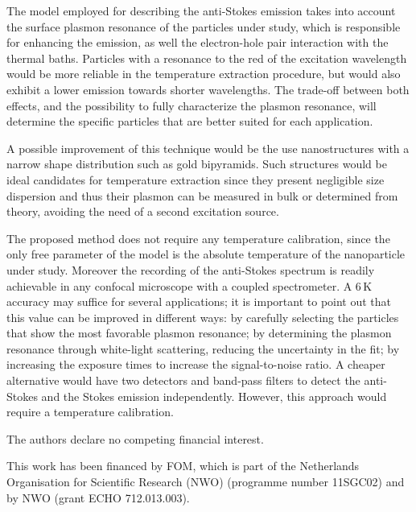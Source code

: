 \documentclass[journal=nalefd,manuscript=letter]{achemso}
\newcommand{\HI}[1]{{#1}} %
\newcommand{\K}{\ensuremath{\,\textrm{K}}}
\begin{document}
\HI{The model employed for describing the anti-Stokes emission takes into account
the surface plasmon resonance of the particles under study, which is responsible 
for enhancing the emission, as well the electron-hole pair
interaction with the thermal baths.}
Particles with a resonance to the red of the excitation wavelength would be more
reliable in the temperature extraction procedure, but would also exhibit a lower
emission towards shorter wavelengths. The trade-off between both effects, and
the possibility to fully characterize the plasmon resonance, will determine the
specific particles that are better suited for each application.

A possible improvement of this technique would be the use nanostructures with a
narrow shape distribution such as gold bipyramids\cite{Pelton2009}. Such
structures would be ideal candidates for temperature extraction since they
present negligible size dispersion and thus their plasmon can be measured in
bulk or determined from theory, avoiding the need of a second excitation source.


The proposed method does not require any temperature calibration, since the only free
parameter of the model is the absolute temperature of the nanoparticle under
study. Moreover the recording of the anti-Stokes spectrum is readily achievable
in any confocal microscope with a coupled spectrometer. A $6\K$ accuracy may
suffice for several applications; it is important to point out that this value
can be improved in different ways: by carefully selecting the particles that
show the most favorable plasmon resonance; by determining the plasmon resonance
through white-light scattering, reducing the uncertainty in the fit; by
increasing the exposure times to increase the signal-to-noise ratio. 
\HI{A cheaper alternative would have two detectors and band-pass 
filters to detect the anti-Stokes and the Stokes emission independently. However,
this approach would require a temperature calibration.}

The authors declare no competing financial interest.

\begin{acknowledgement}
This work has been financed by FOM, which is part of the Netherlands Organisation for Scientific Research (NWO)
(programme number 11SGC02) and by NWO (grant ECHO 712.013.003). 
\end{acknowledgement}
\end{document}
